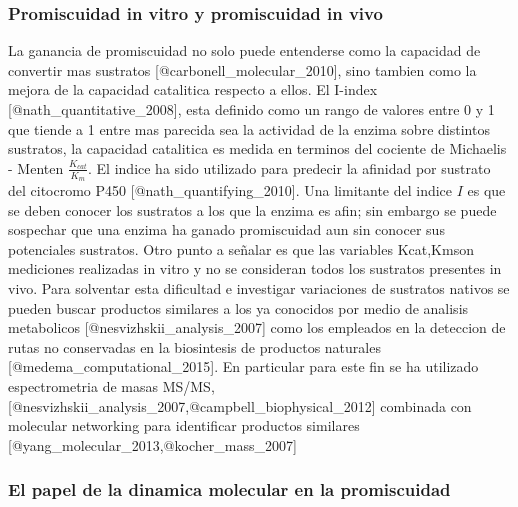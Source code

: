 \documentclass[]{article}
\begin{document}
\subsubsection{Promiscuidad in vitro y promiscuidad in
vivo}\label{promiscuidad-in-vitro-y-promiscuidad-in-vivo}

La ganancia de promiscuidad no solo puede entenderse como la capacidad
de convertir mas sustratos {[}@carbonell\_molecular\_2010{]}, sino
tambien como la mejora de la capacidad catalitica respecto a ellos. El
I-index {[}@nath\_quantitative\_2008{]}, esta definido como un rango de
valores entre 0 y 1 que tiende a 1 entre mas parecida sea la actividad
de la enzima sobre distintos sustratos, la capacidad catalitica es
medida en terminos del cociente de Michaelis - Menten
\(\frac{K_{cat}}{K_m}\). El indice ha sido utilizado para predecir la
afinidad por sustrato del citocromo P450 {[}@nath\_quantifying\_2010{]}.
Una limitante del indice \(I\) es que se deben conocer los sustratos a
los que la enzima es afin; sin embargo se puede sospechar que una enzima
ha ganado promiscuidad aun sin conocer sus potenciales sustratos. Otro
punto a señalar es que las variables Kcat,Kmson mediciones realizadas in
vitro y no se consideran todos los sustratos presentes in vivo. Para
solventar esta dificultad e investigar variaciones de sustratos nativos
se pueden buscar productos similares a los ya conocidos por medio de
analisis metabolicos {[}@nesvizhskii\_analysis\_2007{]} como los
empleados en la deteccion de rutas no conservadas en la biosintesis de
productos naturales {[}@medema\_computational\_2015{]}. En particular
para este fin se ha utilizado espectrometria de masas MS/MS,
{[}@nesvizhskii\_analysis\_2007,@campbell\_biophysical\_2012{]}
combinada con molecular networking para identificar productos similares
{[}@yang\_molecular\_2013,@kocher\_mass\_2007{]}

\subsubsection{El papel de la dinamica molecular en la
promiscuidad}\label{el-papel-de-la-dinamica-molecular-en-la-promiscuidad}
\end{document}
